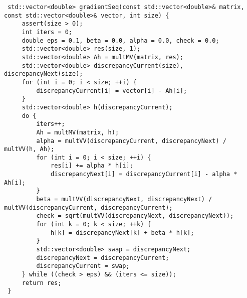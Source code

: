 \documentclass{report}
\begin{document}
\begin{lstlisting}
 std::vector<double> gradientSeq(const std::vector<double>& matrix, const std::vector<double>& vector, int size) {
     assert(size > 0);
     int iters = 0;
     double eps = 0.1, beta = 0.0, alpha = 0.0, check = 0.0;
     std::vector<double> res(size, 1);
     std::vector<double> Ah = multMV(matrix, res);
     std::vector<double> discrepancyCurrent(size), discrepancyNext(size);
     for (int i = 0; i < size; ++i) {
         discrepancyCurrent[i] = vector[i] - Ah[i];
     }
     std::vector<double> h(discrepancyCurrent);
     do {
         iters++;
         Ah = multMV(matrix, h);
         alpha = multVV(discrepancyCurrent, discrepancyNext) / multVV(h, Ah);
         for (int i = 0; i < size; ++i) {
             res[i] += alpha * h[i];
             discrepancyNext[i] = discrepancyCurrent[i] - alpha * Ah[i];
         }
         beta = multVV(discrepancyNext, discrepancyNext) / multVV(discrepancyCurrent, discrepancyCurrent);
         check = sqrt(multVV(discrepancyNext, discrepancyNext));
         for (int k = 0; k < size; ++k) {
             h[k] = discrepancyNext[k] + beta * h[k];
         }
         std::vector<double> swap = discrepancyNext;
         discrepancyNext = discrepancyCurrent;
         discrepancyCurrent = swap;
     } while ((check > eps) && (iters <= size));
     return res;
 }

 \end{lstlisting}
\end{document}
